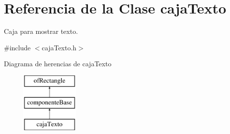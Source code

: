 \hypertarget{classcaja_texto}{}\section{Referencia de la Clase caja\+Texto}
\label{classcaja_texto}


Caja para mostrar texto.  




{\ttfamily \#include $<$caja\+Texto.\+h$>$}

Diagrama de herencias de caja\+Texto\begin{figure}[H]
\begin{center}
\leavevmode
\includegraphics[height=3.000000cm]{classcaja_texto}
\end{center}
\end{figure}
